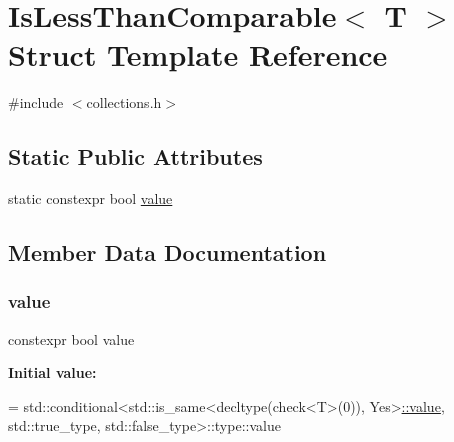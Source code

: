\hypertarget{structstanfordcpplib_1_1collections_1_1IsLessThanComparable}{}\section{Is\+Less\+Than\+Comparable$<$ T $>$ Struct Template Reference}
\label{structstanfordcpplib_1_1collections_1_1IsLessThanComparable}


{\ttfamily \#include $<$collections.\+h$>$}

\subsection*{Static Public Attributes}
\begin{DoxyCompactItemize}
\item 
static constexpr bool \mbox{\hyperlink{structstanfordcpplib_1_1collections_1_1IsLessThanComparable_a5b4ee4ae6cba6bb75200ba7af1910873}{value}}
\end{DoxyCompactItemize}


\subsection{Member Data Documentation}
\mbox{\label{structstanfordcpplib_1_1collections_1_1IsLessThanComparable_a5b4ee4ae6cba6bb75200ba7af1910873}} 
\subsubsection{\texorpdfstring{value}{value}}
{\footnotesize\ttfamily constexpr bool value\hspace{0.3cm}{\ttfamily [static]}}

{\bfseries Initial value\+:}
\begin{DoxyCode}
=
            std::conditional<std::is\_same<decltype(check<T>(0)), Yes>\mbox{\hyperlink{structstanfordcpplib_1_1collections_1_1IsLessThanComparable_a5b4ee4ae6cba6bb75200ba7af1910873}{::value}},
                             std::true\_type,
                             std::false\_type>::type::value
\end{DoxyCode}
